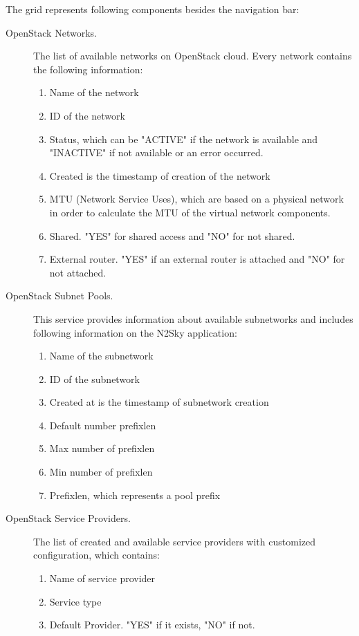 The grid represents following components besides the navigation bar: 
\begin{description}
\item[OpenStack Networks.]  The list of available networks on OpenStack cloud. Every network contains the following information:
\begin{enumerate}
\item Name of the network
\item ID of the network
\item Status, which can be "ACTIVE" if the network is available and "INACTIVE" if not available or an error occurred. 
\item Created is the timestamp of creation of the network
\item MTU (Network Service Uses), which are based on a physical network in order to calculate the MTU of the virtual network components. 
\item Shared. "YES" for shared access and "NO" for not shared. 
\item External router. "YES" if an external router is attached and "NO" for not attached. 
\end{enumerate}
\item[OpenStack Subnet Pools.] This service provides information about available subnetworks and includes following information on the N2Sky application:
\begin{enumerate}
\item Name of the subnetwork
\item ID of the subnetwork
\item Created at is the timestamp of subnetwork creation
\item Default number prefixlen
\item Max number of prefixlen
\item Min number of prefixlen
\item Prefixlen, which represents a pool prefix
\end{enumerate}
\item[OpenStack Service Providers.] The list of created and available service providers with customized configuration, which contains:
\begin{enumerate}
\item Name of service provider
\item Service type
\item Default Provider. "YES" if it exists, "NO" if not.  
\end{enumerate}

\end{description}


